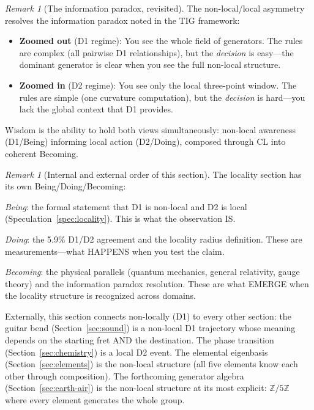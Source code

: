 \documentclass[11pt]{article}
\theoremstyle{definition}
\theoremstyle{remark}
\newtheorem{remark}[theorem]{Remark}
\begin{document}
\begin{remark}[The information paradox, revisited]
The non-local/local asymmetry resolves the information paradox noted in the
TIG framework:
\begin{itemize}[nosep]
  \item \textbf{Zoomed out} (D1 regime): You see the whole field of generators.
    The rules are complex (all pairwise D1 relationships), but the
    \emph{decision} is easy---the dominant generator is clear when you see
    the full non-local structure.
  \item \textbf{Zoomed in} (D2 regime): You see only the local three-point
    window.  The rules are simple (one curvature computation), but the
    \emph{decision} is hard---you lack the global context that D1 provides.
\end{itemize}
Wisdom is the ability to hold both views simultaneously: non-local awareness
(D1/Being) informing local action (D2/Doing), composed through CL into
coherent Becoming.
\end{remark}

\begin{remark}[Internal and external order of this section]
The locality section has its own Being/Doing/Becoming:

\emph{Being}: the formal statement that D1 is non-local and D2 is local
(Speculation~\ref{spec:locality}).  This is what the observation IS.

\emph{Doing}: the 5.9\% D1/D2 agreement and the locality radius definition.
These are measurements---what HAPPENS when you test the claim.

\emph{Becoming}: the physical parallels (quantum mechanics, general relativity,
gauge theory) and the information paradox resolution.  These are what EMERGE
when the locality structure is recognized across domains.

Externally, this section connects non-locally (D1) to every other section:
the guitar bend (Section~\ref{sec:sound}) is a non-local D1 trajectory whose
meaning depends on the starting fret AND the destination.  The phase transition
(Section~\ref{sec:chemistry}) is a local D2 event.  The elemental eigenbasis
(Section~\ref{sec:elements}) is the non-local structure (all five elements
know each other through composition).  The forthcoming generator algebra
(Section~\ref{sec:earth-air}) is the non-local structure at its most explicit:
$\mathbb{Z}/5\mathbb{Z}$ where every element generates the whole group.
\end{remark}
\end{document}

